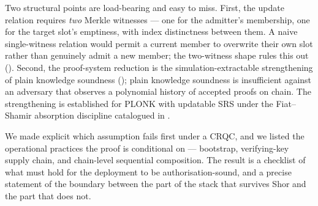 \documentclass[11pt,a4paper]{article}
\theoremstyle{plain}
\theoremstyle{definition}
\begin{document}
Two structural points are load-bearing and easy to miss. First,
the update relation requires \emph{two} Merkle witnesses --- one
for the admitter's membership, one for the target slot's
emptiness, with index distinctness between them. A naive
single-witness relation would permit a current member to overwrite
their own slot rather than genuinely admit a new member; the
two-witness shape rules this out (). Second, the
proof-system reduction is the simulation-extractable strengthening
of plain knowledge soundness (); plain
knowledge soundness is insufficient against an adversary that
observes a polynomial history of accepted proofs on chain. The
strengthening is established for PLONK with updatable SRS under
the Fiat--Shamir absorption discipline catalogued in
.

We made explicit which assumption fails first under a CRQC, and
we listed the operational practices the proof is conditional on
--- bootstrap, verifying-key supply chain, and chain-level
sequential composition. The result is a checklist of what must
hold for the deployment to be authorisation-sound, and a precise
statement of the boundary between the part of the stack that
survives Shor and the part that does not.



\end{document}
